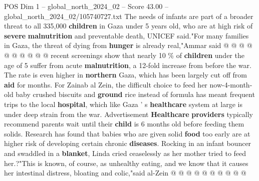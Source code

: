 \begin{textsample}{POS Dim 1 – global\_north\_2024\_02 – Score 43.00 – global\_north\_2024\_02/105740727.txt}
The needs of infants are part of a broader threat to all 335,000 \textbf{children} in Gaza under 5 years old, who are at high risk of \textbf{severe} \textbf{malnutrition} and preventable death, UNICEF said."For many families in Gaza, the threat of dying from \textbf{hunger} is already real,"Ammar said @ @ @ @ @ @ @ @ @ @ recent screenings show that nearly 10 \% of \textbf{children} under the age of 5 suffer from acute \textbf{malnutrition}, a 12-fold increase from before the war.
The rate is even higher in \textbf{northern} Gaza, which has been largely cut off from \textbf{aid} for months.
For Zainab al Zein, the difficult choice to feed her now-4-month-old baby crushed biscuits and \textbf{ground} rice instead of formula has meant frequent trips to the local \textbf{hospital}, which like Gaza ' s \textbf{healthcare} system at large is under deep strain from the war.
Advertisement \textbf{Healthcare} \textbf{providers} typically recommend parents wait until their \textbf{child} is 6 months old before feeding them solids.
Research has found that babies who are given solid \textbf{food} too early are at higher risk of developing certain chronic \textbf{diseases}.
Rocking in an infant bouncer and swaddled in a \textbf{blanket}, Linda cried ceaselessly as her mother tried to feed her.?"This is known, of course, as unhealthy eating, and we know that it causes her intestinal distress, bloating and colic,"said al-Zein @ @ @ @ @ @ @ @ @ @

\end{textsample}
